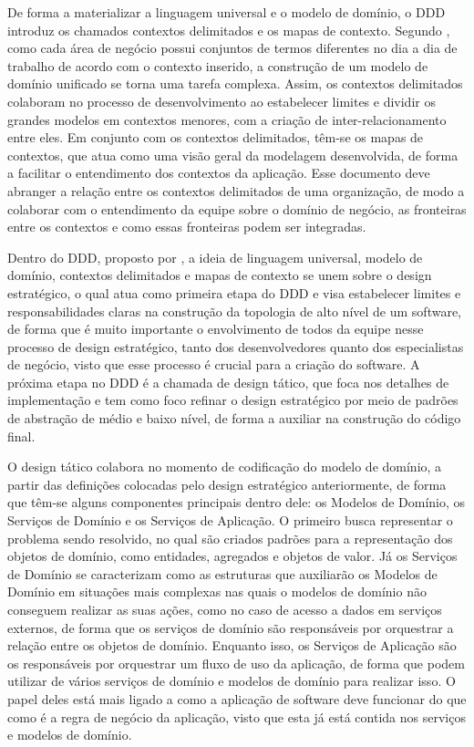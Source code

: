\documentclass[12pt, %
openright, 
oneside, %
a4paper,    %
brazil]{facom-ufu-abntex2}
\begin{document}
De forma a materializar a linguagem universal e o modelo de domínio, o DDD introduz os chamados contextos delimitados e os mapas de contexto. Segundo , como cada área de negócio possui conjuntos de termos diferentes no dia a dia de trabalho de acordo com o contexto inserido, a construção de um modelo de domínio unificado se torna uma tarefa complexa. Assim, os contextos delimitados colaboram no processo de desenvolvimento ao estabelecer limites e dividir os grandes modelos em contextos menores, com a criação de inter-relacionamento entre eles. Em conjunto com os contextos delimitados, têm-se os mapas de contextos, que atua como uma visão geral da modelagem desenvolvida, de forma a facilitar o entendimento dos contextos da aplicação. Esse documento deve abranger a relação entre os contextos delimitados de uma organização, de modo a colaborar com o entendimento da equipe sobre o domínio de negócio, as fronteiras entre os contextos e como essas fronteiras podem ser integradas.

Dentro do DDD, proposto por , a ideia de linguagem universal, modelo de domínio, contextos delimitados e mapas de contexto se unem sobre o design estratégico, o qual atua como primeira etapa do DDD e visa estabelecer limites e responsabilidades claras na construção da topologia de alto nível de um software, de forma que é muito importante o envolvimento de todos da equipe nesse processo de design estratégico, tanto dos desenvolvedores quanto dos especialistas de negócio, visto que esse processo é crucial para a criação do software. A próxima etapa no DDD é a chamada de design tático, que foca nos detalhes de implementação e tem como foco refinar o design estratégico por meio de padrões de abstração de médio e baixo nível, de forma a auxiliar na construção do código final.

O design tático colabora no momento de codificação do modelo de domínio, a partir das definições colocadas pelo design estratégico anteriormente, de forma que têm-se alguns componentes principais dentro dele: os Modelos de Domínio, os Serviços de Domínio e os Serviços de Aplicação. O primeiro busca representar o problema sendo resolvido, no qual são criados padrões para a representação dos objetos de domínio, como entidades, agregados e objetos de valor. Já os Serviços de Domínio se caracterizam como as estruturas que auxiliarão os Modelos de Domínio em situações mais complexas nas quais o modelos de domínio não conseguem realizar as suas ações, como no caso de acesso a dados em serviços externos, de forma que os serviços de domínio são responsáveis por orquestrar a relação entre os objetos de domínio. Enquanto isso, os Serviços de Aplicação são os responsáveis por orquestrar um fluxo de uso da aplicação, de forma que podem utilizar de vários serviços de domínio e modelos de domínio para realizar isso. O papel deles está mais ligado a como a aplicação de software deve funcionar do que como é a regra de negócio da aplicação, visto que esta já está contida nos serviços e modelos de domínio.
\end{document}
